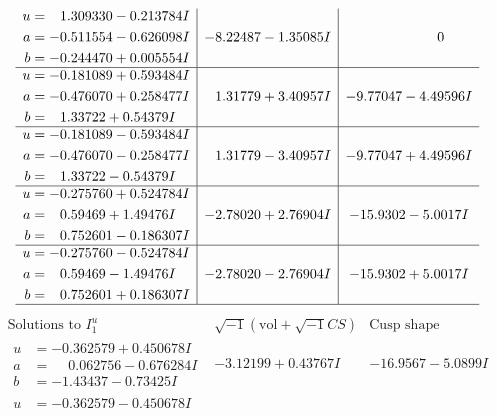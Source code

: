 \documentclass[1p]{elsarticle_modified}
\theoremstyle{definition}
\newcommand{\I}{\sqrt{-1}}
\begin{document}
$$\begin{array}{c|c|c}
\begin{aligned}
u &= \phantom{-}1.309330 - 0.213784 I \\
a &= -0.511554 - 0.626098 I \\
b &= -0.244470 + 0.005554 I\end{aligned}
 & -8.22487 - 1.35085 I & \phantom{-0.000000 } 0 \\ \hline\begin{aligned}
u &= -0.181089 + 0.593484 I \\
a &= -0.476070 + 0.258477 I \\
b &= \phantom{-}1.33722 + 0.54379 I\end{aligned}
 & \phantom{-}1.31779 + 3.40957 I & -9.77047 - 4.49596 I \\ \hline\begin{aligned}
u &= -0.181089 - 0.593484 I \\
a &= -0.476070 - 0.258477 I \\
b &= \phantom{-}1.33722 - 0.54379 I\end{aligned}
 & \phantom{-}1.31779 - 3.40957 I & -9.77047 + 4.49596 I \\ \hline\begin{aligned}
u &= -0.275760 + 0.524784 I \\
a &= \phantom{-}0.59469 + 1.49476 I \\
b &= \phantom{-}0.752601 - 0.186307 I\end{aligned}
 & -2.78020 + 2.76904 I & -15.9302 - 5.0017 I \\ \hline\begin{aligned}
u &= -0.275760 - 0.524784 I \\
a &= \phantom{-}0.59469 - 1.49476 I \\
b &= \phantom{-}0.752601 + 0.186307 I\end{aligned}
 & -2.78020 - 2.76904 I & -15.9302 + 5.0017 I\\
 \hline 
 \end{array}$$\newpage$$\begin{array}{c|c|c}  
\text{Solutions to }I^u_{1}& \I (\text{vol} + \sqrt{-1}CS) & \text{Cusp shape}\\
 \hline 
\begin{aligned}
u &= -0.362579 + 0.450678 I \\
a &= \phantom{-}0.062756 - 0.676284 I \\
b &= -1.43437 - 0.73425 I\end{aligned}
 & -3.12199 + 0.43767 I & -16.9567 - 5.0899 I \\ \hline\begin{aligned}
u &= -0.362579 - 0.450678 I \\

\end{aligned}
\end{array}$$
\end{document}
